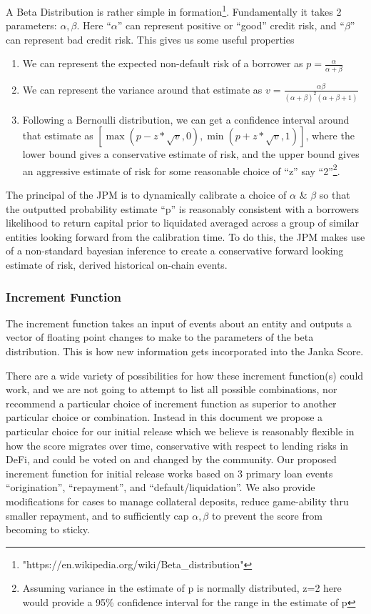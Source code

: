 \documentclass{article}
\begin{document}
    A Beta Distribution is rather simple in formation\footnote{"https://en.wikipedia.org/wiki/Beta\_distribution"}. Fundamentally it takes 2 parameters: $\alpha, \beta$. Here “$\alpha$” can represent positive or “good” credit risk, and “$\beta$” can represent bad credit risk. This gives us some useful properties
    \begin{enumerate}
        \item We can represent the expected non-default risk of a borrower as $p=\frac{\alpha}{\alpha+\beta}$
        \item We can represent the variance around that estimate as $v=\frac{\alpha\beta}{(\alpha+\beta)^2(\alpha+\beta+1)}$
        \item Following a Bernoulli distribution, we can get a confidence interval around that estimate as $[\max{(p-z*\sqrt{v},0)},\min{(p+z*\sqrt{v},1)}]$, where the lower bound gives a conservative estimate of risk, and the upper bound gives an aggressive estimate of risk for some reasonable choice of “z” say “2”\footnote{Assuming variance in the estimate of p is normally distributed, z=2 here would provide a 95\% confidence interval for the range in the estimate of p}.
    \end{enumerate}

The principal of the JPM is to dynamically calibrate a choice of $\alpha$ \& $\beta$ so that the outputted probability estimate “p” is reasonably consistent with a borrowers likelihood to return capital prior to liquidated averaged across a group of similar entities looking forward from the calibration time. To do this, the JPM makes use of a non-standard bayesian inference to create a conservative forward looking estimate of risk, derived historical on-chain events. 

\subsubsection{Increment Function}

The increment function takes an input of events about an entity and outputs a vector of floating point changes to make to the parameters of the beta distribution. This is how new information gets incorporated into the Janka Score.

There are a wide variety of possibilities for how these increment function(s) could work, and we are not going to attempt to list all possible combinations, nor recommend a particular choice of increment function as superior to another particular choice or combination. Instead in this document we propose a particular choice for our initial release which we believe is reasonably flexible in how the score migrates over time, conservative with respect to lending risks in DeFi, and could be voted on and changed by the community. Our proposed increment function for initial release works based on 3 primary loan events “origination”, “repayment”, and “default/liquidation”. We also provide modifications for cases to manage collateral deposits, reduce game-ability thru smaller repayment, and to sufficiently cap $\alpha,\beta$ to prevent the score from becoming to sticky.
\end{document}

